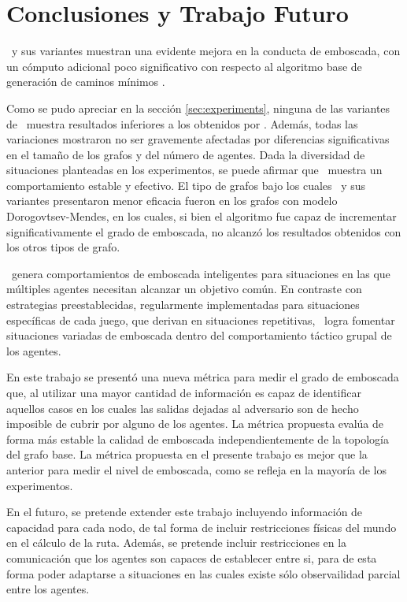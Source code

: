 \section{Conclusiones y Trabajo Futuro}
\label{sec:conclusions}

\ambush\ y sus variantes muestran una evidente mejora en la conducta de
emboscada, con un c\'omputo adicional poco significativo con respecto
al algoritmo base de generaci\'on de caminos m\'inimos \astar.

Como se pudo apreciar en la secci\'on \ref{sec:experiments}, ninguna
de las variantes de \ambush\ muestra resultados inferiores a los obtenidos
por \astar. Adem\'as, todas las variaciones mostraron no ser gravemente
afectadas por diferencias significativas en el tamaño de los grafos y
del n\'umero de agentes. Dada la diversidad de situaciones planteadas
en los experimentos, se puede afirmar que \ambush\ muestra un comportamiento
estable y efectivo. El tipo de grafos bajo los cuales \ambush\ y sus
variantes presentaron menor eficacia fueron en los grafos con modelo
Dorogovtsev-Mendes, en los cuales, si bien el algoritmo fue capaz de
incrementar significativamente el grado de emboscada, no alcanz\'o
los resultados obtenidos con los otros tipos de grafo.

\ambush\ genera comportamientos de emboscada inteligentes para situaciones
en las que múltiples agentes necesitan alcanzar un objetivo común. En
contraste con estrategias preestablecidas, regularmente implementadas para
situaciones específicas de cada juego, que derivan en situaciones repetitivas,
\ambush\ logra fomentar situaciones va\-ria\-das de emboscada dentro del 
comportamiento táctico grupal de los agentes.

En este trabajo se present\'o una nueva m\'etrica para medir el grado de
emboscada que, al utilizar una mayor cantidad de informaci\'on es capaz
de identificar aquellos casos en los cuales las salidas dejadas al
adversario son de hecho imposible de cubrir por alguno de los agentes.
La m\'etrica propuesta eval\'ua de forma m\'as estable la calidad de
emboscada independientemente de la topolog\'ia del grafo base.
La métrica propuesta en el presente trabajo es mejor que la anterior
para medir el nivel de emboscada, como se refleja en la mayoría de
los experimentos.

En el futuro, se pretende extender este trabajo incluyendo informaci\'on
de capacidad para cada nodo, de tal forma de incluir restricciones
f\'isicas del mundo en el c\'alculo de la ruta. Adem\'as, se pretende
incluir restricciones en la comunicaci\'on que los agentes son capaces
de establecer entre si, para de esta forma poder adaptarse a situaciones
en las cuales existe s\'olo observailidad parcial entre los agentes.
